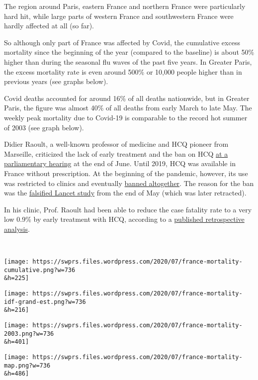 The region around Paris, eastern France and northern France were
particularly hard hit, while large parts of western France and
southwestern France were hardly affected at all (so far).

So although only part of France was affected by Covid, the cumulative
excess mortality since the beginning of the year (compared to the
baseline) is about 50\% higher than during the seasonal flu waves of the
past five years. In Greater Paris, the excess mortality rate is even
around 500\% or 10,000 people higher than in previous years (see graphs
below).

Covid deaths accounted for around 16\% of all deaths nationwide, but in
Greater Paris, the figure was almost 40\% of all deaths from early March
to late May. The weekly peak mortality due to Covid-19 is comparable to
the record hot summer of 2003 (see graph below).

Didier Raoult, a well-known professor of medicine and HCQ pioneer from
Marseille, criticized the lack of early treatment and the ban on HCQ
\href{http://covexit.com/shock-testimony-of-professor-raoult-at-french-national-assembly/}{at
a parliamentary hearing} at the end of June. Until 2019, HCQ was
available in France without prescription. At the beginning of the
pandemic, however, its use was restricted to clinics and eventually
\href{https://www.france24.com/en/20200527-france-revokes-decree-authorising-use-of-hydroxychloroquine-to-treat-covid-19}{banned
altogether}. The reason for the ban was the
\href{https://omnij.org/Gilead:_Twenty-one_billion_reasons_to_discredit_hydroxychloroquine_(ORIGINAL_ARTICLE)}{falsified
Lancet study} from the end of May (which was later retracted).

In his clinic, Prof. Raoult had been able to reduce the case fatality
rate to a very low 0.9\% by early treatment with HCQ, according to a
\href{https://www.sciencedirect.com/science/article/pii/S1477893920302817}{published
retrospective analysis}.

~

\texttt{[image: https://swprs.files.wordpress.com/2020/07/france-mortality-cumulative.png?w=736\\\&h=225]}

\texttt{[image: https://swprs.files.wordpress.com/2020/07/france-mortality-idf-grand-est.png?w=736\\\&h=216]}

\texttt{[image: https://swprs.files.wordpress.com/2020/07/france-mortality-2003.png?w=736\\\&h=401]}

\texttt{[image: https://swprs.files.wordpress.com/2020/07/france-mortality-map.png?w=736\\\&h=486]}


